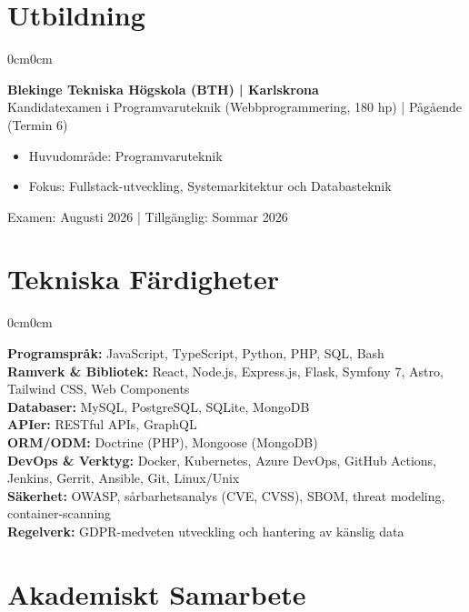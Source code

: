 \documentclass[10pt, letterpaper]{article}
\newenvironment{highlights}{
    \begin{itemize}[topsep=0.10cm, parsep=0.10cm, partopsep=0pt, itemsep=0pt, leftmargin=10pt]
}{
    \end{itemize}
}
\newenvironment{onecolentry}{
    \begin{adjustwidth}{0cm}{0cm}
}{
    \end{adjustwidth}
}
\begin{document}
    \section{Utbildning}
    \begin{onecolentry}
        \textbf{Blekinge Tekniska Högskola (BTH) | Karlskrona} \\
        Kandidatexamen i Programvaruteknik (Webbprogrammering, 180 hp) | Pågående (Termin 6)
        \begin{highlights}
            \item Huvudområde: Programvaruteknik
            \item Fokus: Fullstack-utveckling, Systemarkitektur och Databasteknik
        \end{highlights}
        Examen: Augusti 2026 | Tillgänglig: Sommar 2026
    \end{onecolentry}

    \section{Tekniska Färdigheter}
    \begin{onecolentry}
        \textbf{Programspråk:} JavaScript, TypeScript, Python, PHP, SQL, Bash \\[0.15cm]
        \textbf{Ramverk \& Bibliotek:} React, Node.js, Express.js, Flask, Symfony 7, Astro, Tailwind CSS, Web Components \\[0.15cm]
        \textbf{Databaser:} MySQL, PostgreSQL, SQLite, MongoDB \\[0.15cm]
        \textbf{APIer:} RESTful APIs, GraphQL \\[0.15cm]
        \textbf{ORM/ODM:} Doctrine (PHP), Mongoose (MongoDB) \\[0.15cm]
        \textbf{DevOps \& Verktyg:} Docker, Kubernetes, Azure DevOps, GitHub Actions, Jenkins, Gerrit, Ansible, Git, Linux/Unix \\[0.15cm]
        \textbf{Säkerhet:} OWASP, sårbarhetsanalys (CVE, CVSS), SBOM, threat modeling, container-scanning \\[0.15cm]
        \textbf{Regelverk:} GDPR-medveten utveckling och hantering av känslig data
    \end{onecolentry}

    \section{Akademiskt Samarbete}
\end{document}
